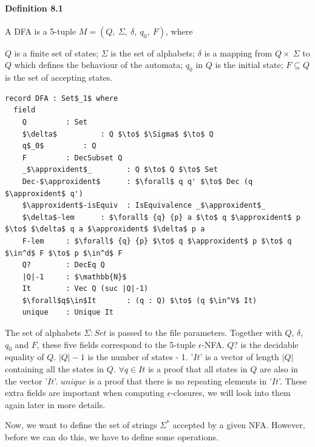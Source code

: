 \documentclass[twoside,openright,final]{bhamthesis}
\renewcommand{\item}{\itemindent0.5cm\itemold}
\newcommand*{\approxident}{%
  \mathrel{\vcenter{\offinterlineskip
  \hbox{$\sim$}\vskip-.35ex\hbox{$\sim$}\vskip-.35ex\hbox{$\sim$}}}}
\begin{document}
\paragraph{Definition 8.1} A DFA is a 5-tuple \(M = (Q
,\ \Sigma,\ \delta,\ q_0,\ F)\), where
\begin{enumerate}[nolistsep]
  \item \(Q\) is a finite set of states;
  \item \(\Sigma\) is the set of alphabets;
  \item \(\delta\) is a mapping from \(Q \times\ \Sigma\) to \(Q\)
    which defines the behaviour of the automata;
  \item \(q_0\) in \(Q\) is the initial state;
  \item \(F \subseteq Q\) is the set of accepting states. 
\end{enumerate}
\begin{lstlisting}[caption=NFA,mathescape=true]
record DFA : Set$_1$ where
  field
    Q         : Set
    $\delta$          : Q $\to$ $\Sigma$ $\to$ Q
    q$_0$         : Q
    F         : DecSubset Q
    _$\approxident$_        : Q $\to$ Q $\to$ Set
    Dec-$\approxident$      : $\forall$ q q' $\to$ Dec (q $\approxident$ q')
    $\approxident$-isEquiv  : IsEquivalence _$\approxident$_
    $\delta$-lem      : $\forall$ {q} {p} a $\to$ q $\approxident$ p $\to$ $\delta$ q a $\approxident$ $\delta$ p a
    F-lem     : $\forall$ {q} {p} $\to$ q $\approxident$ p $\to$ q $\in^d$ F $\to$ p $\in^d$ F
    Q?        : DecEq Q
    |Q|-1     : $\mathbb{N}$
    It        : Vec Q (suc |Q|-1)
    $\forall$q$\in$It       : (q : Q) $\to$ (q $\in^V$ It)
    unique    : Unique It
\end{lstlisting}
\vspace{1pc}
\par The set of alphabets \(\Sigma : Set\) is passed to the file
parameters. Together with \(Q\), \(\delta\),
\(q_0\) and \(F\), these five fields correspond to the 5-tuple
\(\epsilon\)-NFA. \(Q?\) is
the decidable equality of \(Q\). \(|Q|-1\) is the number of states -
1. '\(It\)' is a vector of length \(|Q|\) containing all the
states in \(Q\). \(\forall q\in It\) is a
proof that all states in \(Q\) are also in the vector
'\(It\)'. \(unique\) is a proof that there is no repeating elements in
'\(It\)'. These extra fields are important when computing
\(\epsilon\)-closures, we will look into them again later in more
details.  

\par Now, we want to define the set of strings \(\Sigma^*\) accepted by a given
NFA. However, before we can do this, we have to define
some operations.
\end{document}
